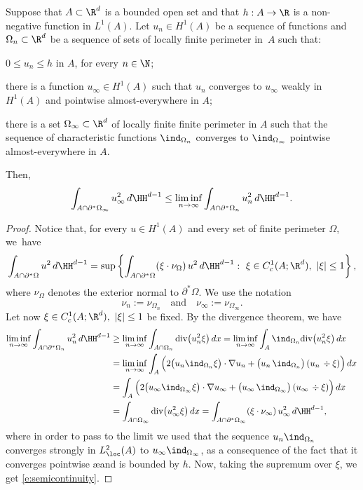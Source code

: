 \begin{lemma}\label{l:semicontinuity}
Suppose that $A\subset\R^d$ is a bounded open set and that $h:A\to \R$ is a non-negative function in $L^1(A)$. Let $u_n\in H^1(A)$ be a sequence of functions and $\Omega_n\subset \R^d$ be a sequence of sets of locally finite perimeter in~$A$ such that:
\begin{enumeratea}
\item $0\le u_n\le h$ in $A$, for every $n\in\N$;
\item there is a function $u_\infty\in H^1(A)$ such that $u_n$ converges to $u_\infty$ weakly in $H^1(A)$ and pointwise almost-everywhere in $A$;
\item there is a set $\Omega_\infty\subset \R^d$ of locally finite finite perimeter in $A$ such that the sequence of characteristic functions $\ind_{\Omega_n}$ converges to $\ind_{\Omega_\infty}$ pointwise almost-everywhere in $A$.
\end{enumeratea}
Then,
\begin{equation}\label{e:semicontinuity}
\int_{A\cap\partial^\ast\Omega_\infty}u_\infty^2\,d\HH^{d-1}\le \liminf_{n\to\infty} \int_{A\cap\partial^\ast\Omega_n}u_n^2\,d\HH^{d-1}.
\end{equation}
\end{lemma}
\begin{proof}
Notice that, for every $u\!\in\!H^1(A)$ and every set of finite perimeter $\Omega$, we~have
\[\int_{A\cap\partial^\ast \Omega}u^2\,d\HH^{d-1}=\sup\left\{\int_{A\cap\partial^\ast \Omega}(\xi\cdot\nu_\Omega)\, u^2\,d\HH^{d-1}:\ \xi\in C^1_c(A;\R^d),\ |\xi|\le 1\right\},\]
where $\nu_\Omega$ denotes the exterior normal to $\partial^\ast\Omega$. We use the notation
\[\nu_n:=\nu_{\Omega_n}\quad\text{and}\quad \nu_\infty:=\nu_{\Omega_\infty}.\]
Let now $ \xi\in C^1_c(A;\R^d),\ |\xi|\le 1$ be fixed. By the divergence theorem, we have
\begin{align*}
\liminf_{n\to\infty}\int_{A\cap\partial^\ast \Omega_n}u_n^2\,d\HH^{d-1}&\ge
\liminf_{n\to\infty}\int_{A\cap\Omega_n}\text{div}\big(u_n^2\xi\big)\,dx = \liminf_{n\to\infty}\int_{A}\ind_{\Omega_n}\text{div}\big(u_n^2\xi\big)\,dx \\
&= \liminf_{n\to\infty}\int_{A}\Big(2\big(u_n\ind_{\Omega_n}\xi\big)\cdot \nabla u_n+\big(u_n\,\ind_{\Omega_n}\big)\,(u_n\,\div\xi)\Big)\,dx\,\\
&= \int_{A}\Big(2\big(u_\infty\ind_{\Omega_\infty}\xi\big)\cdot \nabla u_\infty+\big(u_\infty\,\ind_{\Omega_\infty}\big)\,(u_\infty\,\div\xi)\Big)\,dx\,\\
&=\int_{A\cap\Omega_\infty}\text{div}\big(u_\infty^2\xi\big)\,dx=\int_{A\cap \partial^\ast \Omega_\infty}(\xi\cdot\nu_\infty)\,u_\infty^2\,d\HH^{d-1},
\end{align*}
where in order to pass to the limit we used that the sequence $u_n\ind_{\Omega_n}$ converges strongly in $L^2_{\loc}(A)$ to $u_\infty\ind_{\Omega_\infty}$, as a consequence of the fact that it converges pointwise \ae and is bounded by $h$. Now, taking the supremum over $\xi$, we get \eqref{e:semicontinuity}.
\end{proof}

